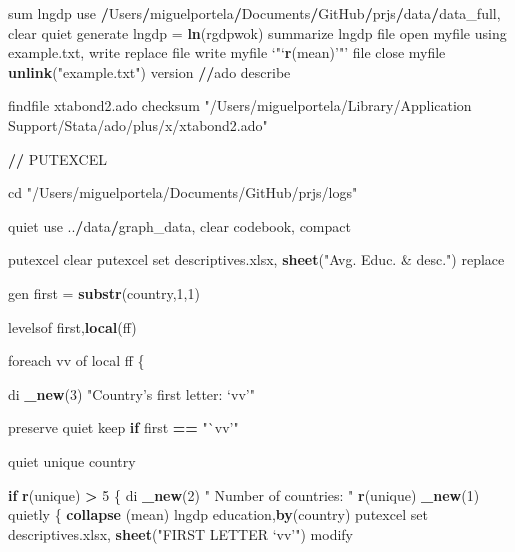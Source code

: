 \documentclass[
  12pt,
]{article}
\newenvironment{Shaded}{\begin{snugshade}}{\end{snugshade}}
\newcommand{\ControlFlowTok}[1]{\textcolor[rgb]{0.13,0.29,0.53}{\textbf{#1}}}
\newcommand{\DataTypeTok}[1]{\textcolor[rgb]{0.13,0.29,0.53}{#1}}
\newcommand{\DecValTok}[1]{\textcolor[rgb]{0.00,0.00,0.81}{#1}}
\newcommand{\ErrorTok}[1]{\textcolor[rgb]{0.64,0.00,0.00}{\textbf{#1}}}
\newcommand{\KeywordTok}[1]{\textcolor[rgb]{0.13,0.29,0.53}{\textbf{#1}}}
\newcommand{\NormalTok}[1]{#1}
\newcommand{\OperatorTok}[1]{\textcolor[rgb]{0.81,0.36,0.00}{\textbf{#1}}}
\newcommand{\StringTok}[1]{\textcolor[rgb]{0.31,0.60,0.02}{#1}}
\begin{document}
\begin{Shaded}
\begin{Highlighting}[]
{\NormalTok{sum lngdp}
\NormalTok{use }\OperatorTok{/}\NormalTok{Users}\OperatorTok{/}\NormalTok{miguelportela}\OperatorTok{/}\NormalTok{Documents}\OperatorTok{/}\NormalTok{GitHub}\OperatorTok{/}\NormalTok{prjs}\OperatorTok{/}\NormalTok{data}\OperatorTok{/}\NormalTok{data_full, clear}
\NormalTok{        quiet generate lngdp =}\StringTok{ }\KeywordTok{ln}\NormalTok{(rgdpwok)}
\NormalTok{      summarize lngdp}
\NormalTok{file open myfile using example.txt, write replace}
\NormalTok{file write myfile }\StringTok{`}\DataTypeTok{"}\StringTok{`}\KeywordTok{r}\NormalTok{(mean)}\StringTok{'"'}
\NormalTok{file close myfile}
\KeywordTok{unlink}\NormalTok{(}\StringTok{"example.txt"}\NormalTok{)}
\NormalTok{version}
\OperatorTok{/}\ErrorTok{/}\NormalTok{ado describe}

\NormalTok{findfile xtabond2.ado}
\NormalTok{checksum }\StringTok{"/Users/miguelportela/Library/Application Support/Stata/ado/plus/x/xtabond2.ado"}

\OperatorTok{/}\ErrorTok{/}\StringTok{ }\NormalTok{PUTEXCEL}

\NormalTok{cd }\StringTok{"/Users/miguelportela/Documents/GitHub/prjs/logs"}

\NormalTok{quiet use ..}\OperatorTok{/}\NormalTok{data}\OperatorTok{/}\NormalTok{graph_data, clear}
\NormalTok{    codebook, compact}

\NormalTok{            putexcel clear}
\NormalTok{            putexcel set descriptives.xlsx, }\KeywordTok{sheet}\NormalTok{(}\StringTok{"Avg. Educ. & desc."}\NormalTok{) replace}
            

\NormalTok{gen first =}\StringTok{ }\KeywordTok{substr}\NormalTok{(country,}\DecValTok{1}\NormalTok{,}\DecValTok{1}\NormalTok{)}

\NormalTok{    levelsof first,}\KeywordTok{local}\NormalTok{(ff)}
    
\NormalTok{    foreach vv of local ff \{}
    
\NormalTok{        di }\KeywordTok{_new}\NormalTok{(}\DecValTok{3}\NormalTok{) }\StringTok{"Country's first letter: `vv'"}
        
\NormalTok{        preserve}
\NormalTok{        quiet keep }\ControlFlowTok{if}\NormalTok{ first }\OperatorTok{==}\StringTok{ "`vv'"}
        
\NormalTok{        quiet unique country}
            
            \ControlFlowTok{if} \KeywordTok{r}\NormalTok{(unique) }\OperatorTok{>}\StringTok{ }\DecValTok{5}\NormalTok{ \{}
\NormalTok{            di }\KeywordTok{_new}\NormalTok{(}\DecValTok{2}\NormalTok{) }\StringTok{"    Number of countries:    "} \KeywordTok{r}\NormalTok{(unique) }\KeywordTok{_new}\NormalTok{(}\DecValTok{1}\NormalTok{)}
\NormalTok{            quietly \{}
                \KeywordTok{collapse}\NormalTok{ (mean) lngdp education,}\KeywordTok{by}\NormalTok{(country)}
\NormalTok{                    putexcel set descriptives.xlsx, }\KeywordTok{sheet}\NormalTok{(}\StringTok{"FIRST LETTER `vv'"}\NormalTok{) modify}
                    
}
\end{Highlighting}
\end{Shaded}
\end{document}
